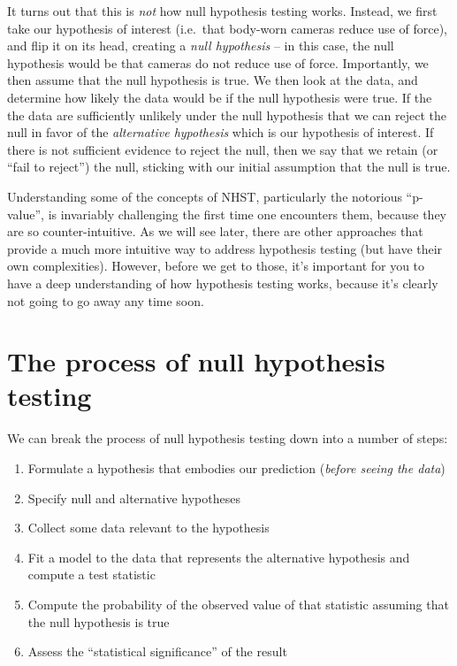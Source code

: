 \documentclass[12pt,]{book}
\providecommand{\tightlist}{%
  \setlength{\itemsep}{0pt}\setlength{\parskip}{0pt}}
\theoremstyle{definition}
\theoremstyle{definition}
\theoremstyle{definition}
\theoremstyle{remark}
\begin{document}
It turns out that this is \emph{not} how null hypothesis testing works. Instead, we first take our hypothesis of interest (i.e.~that body-worn cameras reduce use of force), and flip it on its head, creating a \emph{null hypothesis} -- in this case, the null hypothesis would be that cameras do not reduce use of force. Importantly, we then assume that the null hypothesis is true. We then look at the data, and determine how likely the data would be if the null hypothesis were true. If the the data are sufficiently unlikely under the null hypothesis that we can reject the null in favor of the \emph{alternative hypothesis} which is our hypothesis of interest. If there is not sufficient evidence to reject the null, then we say that we retain (or ``fail to reject'') the null, sticking with our initial assumption that the null is true.

Understanding some of the concepts of NHST, particularly the notorious ``p-value'', is invariably challenging the first time one encounters them, because they are so counter-intuitive. As we will see later, there are other approaches that provide a much more intuitive way to address hypothesis testing (but have their own complexities). However, before we get to those, it's important for you to have a deep understanding of how hypothesis testing works, because it's clearly not going to go away any time soon.

\hypertarget{the-process-of-null-hypothesis-testing}{%
\section{The process of null hypothesis testing}\label{the-process-of-null-hypothesis-testing}}

We can break the process of null hypothesis testing down into a number of steps:

\begin{enumerate}
\def\labelenumi{\arabic{enumi}.}
\tightlist
\item
  Formulate a hypothesis that embodies our prediction (\emph{before seeing the data})
\item
  Specify null and alternative hypotheses
\item
  Collect some data relevant to the hypothesis
\item
  Fit a model to the data that represents the alternative hypothesis and compute a test statistic
\item
  Compute the probability of the observed value of that statistic assuming that the null hypothesis is true
\item
  Assess the ``statistical significance'' of the result
\end{enumerate}
\end{document}
